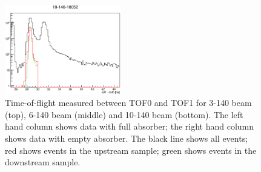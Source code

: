 \begin{figure}[!tbh]
    \includegraphics*[width=0.45\textwidth]{analysis_plots/plots_10-140-empty/tof01.eps}
    \caption{Time-of-flight measured between TOF0 and TOF1 for 3-140 beam (top), 6-140 beam (middle) and 10-140 beam (bottom).
    The left hand column shows data with full absorber; the right hand column shows data with empty absorber.
    The black line shows all events; red shows events in the upstream sample; green shows events in the downstream sample.
\label{fig:tof01}}
\end{figure}

